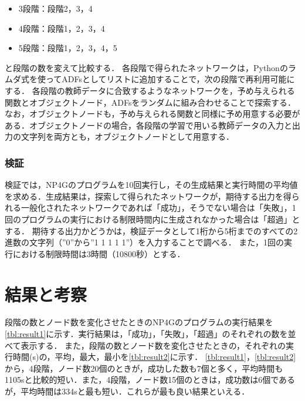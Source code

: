 \documentclass[exploratorypaper]{jsaiart} %
\begin{document}
\begin{itemize}
    \item 3段階：段階2，3，4
    \item 4段階：段階1，2，3，4
    \item 5段階：段階1，2，3，4，5
\end{itemize}
\noindent
と段階の数を変えて比較する．
各段階で得られたネットワークは，Pythonのラムダ式を使ってADFsとしてリストに追加することで，次の段階で再利用可能にする．
各段階の教師データに合致するようなネットワークを，予め与えられる関数とオブジェクトノード，ADFsをランダムに組み合わせることで探索する．
なお，オブジェクトノードも，予め与えられる関数と同様に予め用意する必要がある．オブジェクトノードの場合，各段階の学習で用いる教師データの入力と出力の文字列を両方とも，オブジェクトノードとして用意する．

\subsubsection{検証}
検証では，NP4Gのプログラムを10回実行し，その生成結果と実行時間の平均値を求める．生成結果は，探索して得られたネットワークが，期待する出力を得られる一般化されたネットワークであれば「成功」，そうでない場合は「失敗」，1回のプログラムの実行における制限時間内に生成されなかった場合は「超過」とする．
期待する出力かどうかは，検証データとして1桁から5桁までのすべての2進数の文字列（”0”から”1 1 1 1 1”）を入力することで調べる．
また，1回の実行における制限時間は3時間（10800秒）とする．

\section{結果と考察}
段階の数とノード数を変化させたときのNP4Gのプログラムの実行結果を\ref{tbl:result1}に示す．実行結果は，「成功」，「失敗」，「超過」のそれぞれの数を並べて表示する．
また，段階の数とノード数を変化させたときの，それぞれの実行時間(s)の，平均，最大，最小を\ref{tbl:result2}に示す．
\ref{tbl:result1}，\ref{tbl:result2}から，4段階，ノード数20個のときが，成功した数も7個と多く，平均時間も1105sと比較的短い．また，4段階，ノード数15個のときは，成功数は6個であるが，平均時間は334sと最も短い．これらが最も良い結果といえる．
\end{document}
